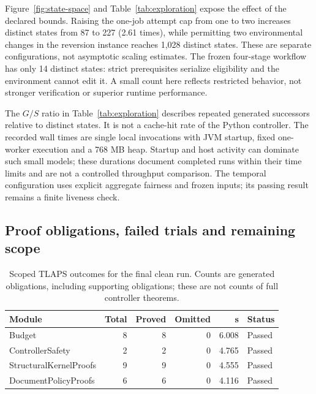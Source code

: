 \documentclass[pdflatex,sn-mathphys-num]{sn-jnl}
\theoremstyle{thmstyleone}
\theoremstyle{thmstylethree}
\theoremstyle{thmstyletwo}
\begin{document}
Figure~\ref{fig:state-space} and Table~\ref{tab:exploration} expose the effect of the declared bounds. Raising the one-job attempt cap from one to two increases distinct states from 87 to 227 (2.61 times), while permitting two environmental changes in the reversion instance reaches 1,028 distinct states. These are separate configurations, not asymptotic scaling estimates. The frozen four-stage workflow has only 14 distinct states: strict prerequisites serialize eligibility and the environment cannot edit it. A small count here reflects restricted behavior, not stronger verification or superior runtime performance.

The $G/S$ ratio in Table~\ref{tab:exploration} describes repeated generated successors relative to distinct states. It is not a cache-hit rate of the Python controller. The recorded wall times are single local invocations with JVM startup, fixed one-worker execution and a 768 MB heap. Startup and host activity can dominate such small models; these durations document completed runs within their time limits and are not a controlled throughput comparison. The temporal configuration uses explicit aggregate fairness and frozen inputs; its passing result remains a finite liveness check.

\subsection{Proof obligations, failed trials and remaining scope}

\begin{table}[tbp]
\centering
\caption{Scoped TLAPS outcomes for the final clean run. Counts are generated obligations, including supporting obligations; these are not counts of full controller theorems.}\label{tab:proof-results}
\footnotesize
\setlength{\tabcolsep}{3pt}
\renewcommand{\arraystretch}{1.13}
\begin{tabularx}{\linewidth}{@{}Xrrrrl@{}}\toprule
Module & Total & Proved & Omitted & s & Status\\\midrule
Budget & 8 & 8 & 0 & 6.008 & Passed\\
ControllerSafety & 2 & 2 & 0 & 4.765 & Passed\\
StructuralKernelProofs & 9 & 9 & 0 & 4.555 & Passed\\
DocumentPolicyProofs & 6 & 6 & 0 & 4.116 & Passed\\
\bottomrule\end{tabularx}
\end{table}
\end{document}
